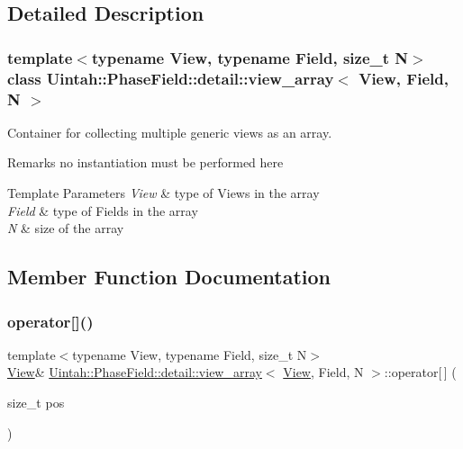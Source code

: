 \subsection{Detailed Description}
\subsubsection*{template$<$typename View, typename Field, size\+\_\+t N$>$\newline
class Uintah\+::\+Phase\+Field\+::detail\+::view\+\_\+array$<$ View, Field, N $>$}

Container for collecting multiple generic views as an array. 

\begin{DoxyRemark}{Remarks}
no instantiation must be performed here
\end{DoxyRemark}

\begin{DoxyTemplParams}{Template Parameters}
{\em View} & type of Views in the array \\
\hline
{\em Field} & type of Fields in the array \\
\hline
{\em N} & size of the array \\
\hline
\end{DoxyTemplParams}


\subsection{Member Function Documentation}
\mbox{\label{classUintah_1_1PhaseField_1_1detail_1_1view__array_a5f4495be42ef2dbe399b717c09766f0d}} 
\subsubsection{\texorpdfstring{operator[]()}{operator[]()}\hspace{0.1cm}{\footnotesize\ttfamily [1/2]}}
{\footnotesize\ttfamily template$<$typename View, typename Field, size\+\_\+t N$>$ \\
\hyperlink{namespaceUintah_1_1PhaseField_a59210a1e28eba254d428762c92ddeabb}{View}\& \hyperlink{classUintah_1_1PhaseField_1_1detail_1_1view__array}{Uintah\+::\+Phase\+Field\+::detail\+::view\+\_\+array}$<$ \hyperlink{namespaceUintah_1_1PhaseField_a59210a1e28eba254d428762c92ddeabb}{View}, Field, N $>$\+::operator\mbox{[}$\,$\mbox{]} (\begin{DoxyParamCaption}\item[{size\+\_\+t}]{pos }\end{DoxyParamCaption})\hspace{0.3cm}{\ttfamily [inline]}}



